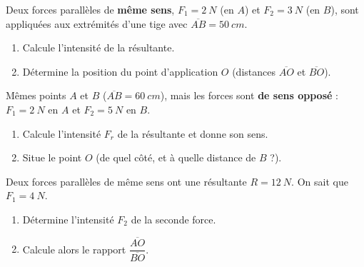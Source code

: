 \documentclass[11pt,a4paper]{article}
\begin{document}
\begin{exo}
Deux forces parallèles de \textbf{même sens}, $F_1=\qty{2}{N}$ (en $A$) et $F_2=\qty{3}{N}$ (en $B$),
sont appliquées aux extrémités d'une tige avec $\overline{AB}=\qty{50}{cm}$.
\begin{enumerate}[label=\alph*)]
  \item Calcule l'intensité de la résultante.
  \item Détermine la position du point d'application $O$ (distances $\overline{AO}$ et $\overline{BO}$).
\end{enumerate}
\end{exo}

\begin{exo}
Mêmes points $A$ et $B$ ($\overline{AB}=\qty{60}{cm}$), mais les forces sont \textbf{de sens opposé} :
$F_1=\qty{2}{N}$ en $A$ et $F_2=\qty{5}{N}$ en $B$.
\begin{enumerate}[label=\alph*)]
  \item Calcule l'intensité $F_r$ de la résultante et donne son sens.
  \item Situe le point $O$ (de quel côté, et à quelle distance de $B$ ?).
\end{enumerate}
\end{exo}

\begin{exo}
Deux forces parallèles de même sens ont une résultante $R=\qty{12}{N}$. On sait que $F_1=\qty{4}{N}$.
\begin{enumerate}[label=\alph*)]
  \item Détermine l'intensité $F_2$ de la seconde force.
  \item Calcule alors le rapport $\dfrac{\overline{AO}}{\overline{BO}}$.
\end{enumerate}
\end{exo}
\end{document}
